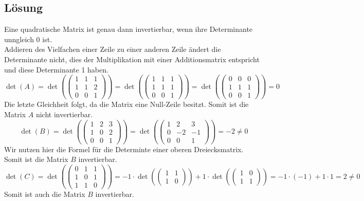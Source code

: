 \subsection*{L\"osung}
Eine quadratische Matrix ist genau dann invertierbar, wenn ihre Determinante unngleich 0 ist. \\
Addieren des Vielfachen einer Zeile zu einer anderen Zeile ändert die Determinante nicht, dies der Multiplikation mit einer Additionsmatrix entspricht und diese Determinante 1 haben. 
$$
\det(A)=\det(\begin{pmatrix} 1 & 1 & 1 \\ 1 & 1 &2 \\ 0&0&1\end{pmatrix})=\det(\begin{pmatrix} 1 & 1 & 1 \\ 1 & 1 &1 \\ 0&0&1\end{pmatrix})=\det(\begin{pmatrix} 0 & 0 & 0 \\ 1 & 1 &1 \\ 0&0&1\end{pmatrix})=0
$$
Die letzte Gleichheit folgt, da die Matrix eine Null-Zeile besitzt. Somit ist die Matrix $A$ nicht invertierbar.
$$
\det(B)=\det(\begin{pmatrix} 1 & 2 & 3 \\ 1 & 0 &2 \\ 0&0&1\end{pmatrix})=\det(\begin{pmatrix} 1 & 2 & 3 \\ 0 & -2 &-1 \\ 0&0&1\end{pmatrix})=-2 \ne 0
$$
Wir nutzen hier die Formel für die Determinte einer oberen Dreiecksmatrix. Somit ist die Matrix $B$ invertierbar.
$$
\det(C)=\det(\begin{pmatrix} 0 & 1 & 1 \\ 1 & 0 &1 \\ 1&1&0\end{pmatrix})=-1\cdot \det(\begin{pmatrix} 1  &1 \\ 1&0\end{pmatrix})+1\cdot \det(\begin{pmatrix} 1 &0 \\ 1&1\end{pmatrix})=-1\cdot(-1) + 1 \cdot 1=2 \ne 0
$$
Somit ist auch die Matrix $B$ invertierbar.


